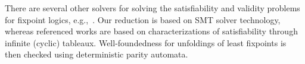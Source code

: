 \documentclass{tlp}
\begin{document}
There are several other solvers for solving the satisfiability and validity problems for fixpoint logics, e.g.,~\cite{atva/FriedmannL09}. Our reduction is based on SMT solver technology, whereas referenced works are based on characterizations of satisfiability through infinite (cyclic) tableaux. Well-foundedness for unfoldings of least fixpoints is then checked using deterministic parity automata.




\clearpage
\end{document}
